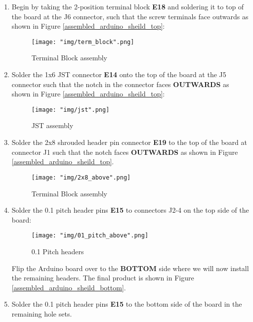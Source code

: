 \documentclass{article}
\begin{document}
\begin{enumerate}

	\item Begin by taking the 2-position terminal block \textbf{E18} and soldering it to top of the board at the J6 connector, such that the screw terminals face outwards as shown in Figure \ref{assembled_arduino_sheild_top}:


\begin{figure}[H]
	\centering
	\texttt{[image: "img/term\_block".png]}
	\caption{Terminal Block assembly}
\end{figure}


	\item Solder the 1x6 JST connector \textbf{E14} onto the top of the board at the J5 connector such that the notch in the connector faces \textbf{OUTWARDS} as shown in Figure \ref{assembled_arduino_sheild_top}:

\begin{figure}[H]
	\centering
	\texttt{[image: "img/jst".png]}
	\caption{JST assembly}
\end{figure}

	\item Solder the 2x8 shrouded header pin connector \textbf{E19} to the top of the board at connector J1 such that the notch faces \textbf{OUTWARDS} as shown in Figure \ref{assembled_arduino_sheild_top}.

\begin{figure}[H]
	\centering
	\texttt{[image: "img/2x8\_above".png]}
	\caption{Terminal Block assembly}
\end{figure}

	\item Solder the 0.1 pitch header pins \textbf{E15} to connectors J2-4 on the top side of the board:

\begin{figure}[H]
	\centering
	\texttt{[image: "img/01\_pitch\_above".png]}
	\caption{0.1 Pitch headers}
\end{figure}

Flip the Arduino board over to the \textbf{BOTTOM} side where we will now install the remaining headers. The final product is shown in Figure \ref{assembled_arduino_sheild_bottom}.

	\item Solder the 0.1 pitch header pins \textbf{E15} to the bottom side of the board in the remaining hole sets.


\end{enumerate}
\end{document}
